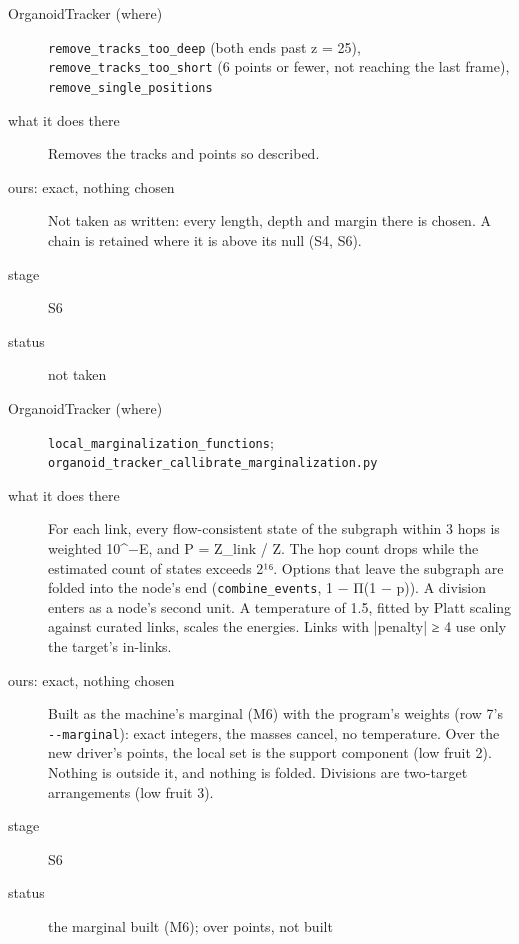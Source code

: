 \begin{description}
\item[{OrganoidTracker (where)}] \texttt{remove\_\allowbreak{}tracks\_\allowbreak{}too\_\allowbreak{}deep} (both ends past z = 25), \texttt{remove\_\allowbreak{}tracks\_\allowbreak{}too\_\allowbreak{}short} (6 points or fewer, not reaching the last frame), \texttt{remove\_\allowbreak{}single\_\allowbreak{}positions}
\item[{what it does there}] Removes the tracks and points so described.
\item[{ours: exact, nothing chosen}] Not taken as written: every length, depth and margin there is chosen. A chain is retained where it is above its null (S4, S6).
\item[{stage}] S6
\item[{status}] not taken
\end{description}

\begin{description}
\item[{OrganoidTracker (where)}] \texttt{local\_\allowbreak{}marginalization\_\allowbreak{}functions}; \texttt{organoid\_\allowbreak{}tracker\_\allowbreak{}callibrate\_\allowbreak{}marginalization.\allowbreak{}py}
\item[{what it does there}] For each link, every flow-consistent state of the subgraph within 3 hops is weighted 10\textasciicircum{}−E, and P = Z\_\allowbreak{}link / Z. The hop count drops while the estimated count of states exceeds 2¹⁶. Options that leave the subgraph are folded into the node's end (\texttt{combine\_\allowbreak{}events}, 1 − Π(1 − p)). A division enters as a node's second unit. A temperature of 1.5, fitted by Platt scaling against curated links, scales the energies. Links with |penalty| ≥ 4 use only the target's in-links.
\item[{ours: exact, nothing chosen}] Built as the machine's marginal (M6) with the program's weights (row 7's \texttt{-\allowbreak{}-\allowbreak{}marginal}): exact integers, the masses cancel, no temperature. Over the new driver's points, the local set is the support component (low fruit 2). Nothing is outside it, and nothing is folded. Divisions are two-target arrangements (low fruit 3).
\item[{stage}] S6
\item[{status}] the marginal built (M6); over points, not built
\end{description}

